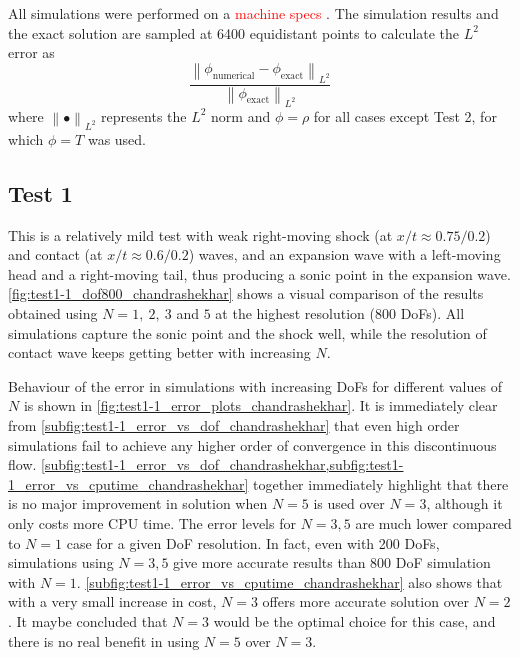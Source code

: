 \documentclass[a4paper,11pt,oneside]{article}
\newcommand{\norm}[1]{\left\lVert#1\right\rVert}
\newcommand{\comment}[1]{
	{\sffamily\textcolor{red}{#1}}%
} %
\begin{document}
All simulations were performed on a \comment{machine specs}. The simulation results and the exact solution are sampled at 6400 equidistant points to calculate the $L^2$ error as
\begin{equation*}
\frac{\norm{\phi_\text{numerical} - \phi_\text{exact}}_{L^2}}{\norm{\phi_\text{exact}}_{L^2}}
\end{equation*}
where $\norm{\bullet}_{L^2}$ represents the $L^2$ norm and $\phi=\rho$ for all cases except Test 2, for which $\phi=T$ was used.

\subsection{Test 1}
\label{subsec:test1-1}

This is a relatively mild test with weak right-moving shock (at $x/t \approx 0.75/0.2$) and contact (at $x/t \approx 0.6/0.2$) waves, and an expansion wave with a left-moving head and a right-moving tail, thus producing a sonic point in the expansion wave. \cref{fig:test1-1_dof800_chandrashekhar} shows a visual comparison of the results obtained using $N=1,\ 2,\ 3$ and $5$ at the highest resolution (800 DoFs). All simulations capture the sonic point and the shock well, while the resolution of contact wave keeps getting better with increasing $N$.

Behaviour of the error in simulations with increasing DoFs for different values of $N$ is shown in \cref{fig:test1-1_error_plots_chandrashekhar}. It is immediately clear from \cref{subfig:test1-1_error_vs_dof_chandrashekhar} that even high order simulations fail to achieve any higher order of convergence in this discontinuous flow. \cref{subfig:test1-1_error_vs_dof_chandrashekhar,subfig:test1-1_error_vs_cputime_chandrashekhar} together immediately highlight that there is no major improvement in solution when $N=5$ is used over $N=3$, although it only costs more CPU time. The error levels for $N=3,5$ are much lower compared to $N=1$ case for a given DoF resolution. In fact, even with 200 DoFs, simulations using $N=3,5$ give more accurate results than 800 DoF simulation with $N=1$. \cref{subfig:test1-1_error_vs_cputime_chandrashekhar} also shows that with a very small increase in cost, $N=3$ offers more accurate solution over $N=2$. It maybe concluded that $N=3$ would be the optimal choice for this case, and there is no real benefit in using $N=5$ over $N=3$.
\end{document}
